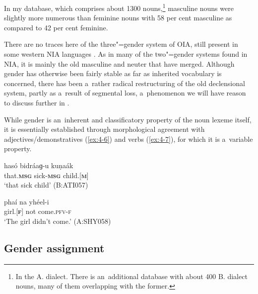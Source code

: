 In my database, which comprises about 1300 nouns,\footnote{In the A. dialect. There is an~additional database with about 400 B. dialect nouns, many of them overlapping with the former.} masculine nouns were slightly more numerous than feminine nouns with 58 per cent masculine as compared to 42 per cent feminine.


There are no traces here of the three"=gender system of OIA, still present in some western NIA languages \citep[220--221]{masica1991}. As in many of the two"=gender systems found in NIA, it is mainly the old masculine and neuter that have merged. Although gender has otherwise been fairly stable as far as inherited vocabulary is concerned, there has been a~rather radical restructuring of the old declensional system, partly as a~result of segmental loss, a~phenomenon we will have reason to discuss further in .


While gender is an~inherent and classificatory property of the noun lexeme itself, it is essentially established through morphological agreement with adjectives/demonstratives (\ref{ex:4-6}) and verbs (\ref{ex:4-7}), for which it is a~variable property. 


\begin{exe}
\ex
\label{ex:4-6}
\gll hasó bidráaɡ-u kuṇaák \\
	that.\textbf{\textsc{msg}} sick-\textbf{\textsc{msg}} child.[\textbf{\textsc{m}}] \\
\glt `that sick child' (B:ATI057)
\end{exe}

\begin{exe}
\ex
\label{ex:4-7}
\gll phaí na yhéel-i \\
	girl.[\textbf{\textsc{f}}] not come.\textsc{pfv-\textsc{f}} \\
\glt `The girl didn't come.' (A:SHY058)
\end{exe}

\subsection{Gender assignment}
\label{subsec:4-3-1}


